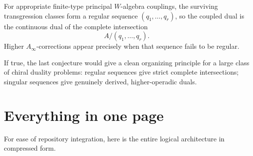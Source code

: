 \begin{conjecture}
For appropriate finite-type principal \(W\)-algebra couplings, the surviving transgression classes form a regular sequence \((q_1,\dots,q_r)\), so the coupled dual is the continuous dual of the complete intersection
\[
A/(q_1,\dots,q_r).
\]
Higher \(A_\infty\)-corrections appear precisely when that sequence fails to be regular.
\end{conjecture}

\begin{remark}
If true, the last conjecture would give a clean organizing principle for a large class of chiral duality problems: regular sequences give strict complete intersections; singular sequences give genuinely derived, higher-operadic duals.
\end{remark}

\appendix

\section{Everything in one page}

For ease of repository integration, here is the entire logical architecture in compressed form.

